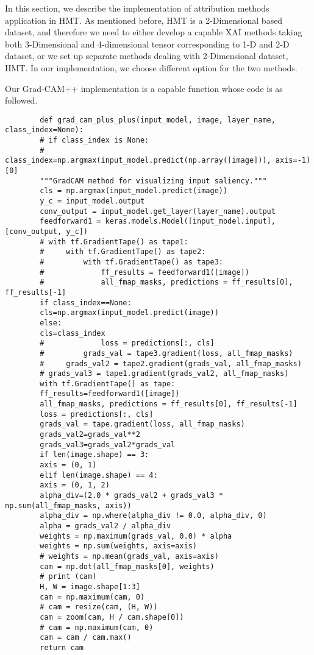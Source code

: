 \documentclass[conference]{IEEEtran}
\begin{document}
	In this section, we describe the implementation of attribution methods application in HMT. As mentioned before, HMT is a 2-Dimensional based dataset, and therefore we need to either develop a capable XAI methods taking both 3-Dimensional and 4-dimensional tensor corresponding to 1-D and 2-D dataset, or we set up separate methods dealing with 2-Dimensional dataset, HMT. In our implementation, we choose different option for the two methods.\par
	
	Our Grad-CAM++ implementation is a capable function whose code is as followed.
	
	\begin{lstlisting}
		def grad_cam_plus_plus(input_model, image, layer_name, class_index=None):
		# if class_index is None:
		#     class_index=np.argmax(input_model.predict(np.array([image])), axis=-1)[0]
		"""GradCAM method for visualizing input saliency."""
		cls = np.argmax(input_model.predict(image))
		y_c = input_model.output
		conv_output = input_model.get_layer(layer_name).output
		feedforward1 = keras.models.Model([input_model.input], [conv_output, y_c])
		# with tf.GradientTape() as tape1:
		#     with tf.GradientTape() as tape2:
		#         with tf.GradientTape() as tape3:
		#             ff_results = feedforward1([image])
		#             all_fmap_masks, predictions = ff_results[0], ff_results[-1]
		if class_index==None:
		cls=np.argmax(input_model.predict(image))
		else:
		cls=class_index
		#             loss = predictions[:, cls]
		#         grads_val = tape3.gradient(loss, all_fmap_masks)
		#     grads_val2 = tape2.gradient(grads_val, all_fmap_masks)
		# grads_val3 = tape1.gradient(grads_val2, all_fmap_masks)
		with tf.GradientTape() as tape:
		ff_results=feedforward1([image])
		all_fmap_masks, predictions = ff_results[0], ff_results[-1]
		loss = predictions[:, cls]
		grads_val = tape.gradient(loss, all_fmap_masks)
		grads_val2=grads_val**2
		grads_val3=grads_val2*grads_val
		if len(image.shape) == 3:
		axis = (0, 1)
		elif len(image.shape) == 4:
		axis = (0, 1, 2)
		alpha_div=(2.0 * grads_val2 + grads_val3 * np.sum(all_fmap_masks, axis))
		alpha_div = np.where(alpha_div != 0.0, alpha_div, 0)
		alpha = grads_val2 / alpha_div
		weights = np.maximum(grads_val, 0.0) * alpha
		weights = np.sum(weights, axis=axis)
		# weights = np.mean(grads_val, axis=axis)
		cam = np.dot(all_fmap_masks[0], weights)
		# print (cam)
		H, W = image.shape[1:3]
		cam = np.maximum(cam, 0)
		# cam = resize(cam, (H, W))
		cam = zoom(cam, H / cam.shape[0])
		# cam = np.maximum(cam, 0)
		cam = cam / cam.max()
		return cam
	\end{lstlisting}
	
\end{document}
